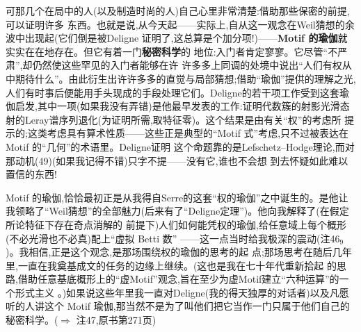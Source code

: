 可那几个在局中的人(以及制造时尚的人)自己心里非常清楚:借助那些保密的前提,可以证明许多
东西。也就是说,从今天起——实际上,自从这一观念在Weil猜想的余波中出现起(它们倒是被Deligne
证明了,这总算是个加分项!)——\textbf{Motif 的瑜伽}就实实在在地存在。但它有着一门\textbf{秘密科学}的
地位:入门者肯定寥寥。它尽管“不严肃”,却仍然\dmark{}使这些罕见的入门者能够在许
许多多上同调的处境中说出“人们有权从中期待什么”。由此衍生出许许多多的直觉与局部猜想;借助“瑜伽”提供的理解之光,人们有时事后便能用手头现成的手段处理它们。Deligne的若干项工作受到这套瑜伽启发,其中一项(如果我没有弄错)是他最早发表的工作:证明代数簇的射影光滑态射的Leray谱序列退化(为证明所需,取特征零)。这个结果是由有关“权”的考虑所
提示的;这类考虑具有算术性质——这些正是典型的“Motif 式”考虑,只不过被表达在 Motif 的“几何”的术语里。Deligne证明
这个命题靠的是Lefschetz--Hodge理论,而对那动机(49)(如果我记得不错)只字不提——没有它,谁也不会想
到去怀疑如此难以置信的东西!

Motif 的瑜伽,恰恰最初正是从我得自Serre的这套“权的瑜伽”之中诞生的。是他让我领略了“Weil猜想”的全部魅力(后来有了“Deligne定理”)。他向我解释了(在假定所论特征下存在奇点消解的
前提下)人们如何能凭权的瑜伽,给任意域上每个概形(不必光滑也不必真)配上“虚拟 Betti 数”
——这一点当时给我极深的震动(注46$_{9}$)。我相信,正是这个观念,是那场围绕权的瑜伽的思考的起
点;那场思考在随后几年里,一直在我奠基成文的任务的边缘上继续。(这也是我在七十年代重新拾起
的思路,借助任意基底概形上的“虚Motif”观念,旨在至少为虚Motif建立“六种运算”的一个形式主义
。)如果说这些年里我一直对Deligne(我的得天独厚的对话者)以及凡愿听的人讲这个
Motif 瑜伽,那当然不是为了叫他们把它当作一门只属于他们自己的秘密科学。($\Rightarrow$
注47,原书第271页)

